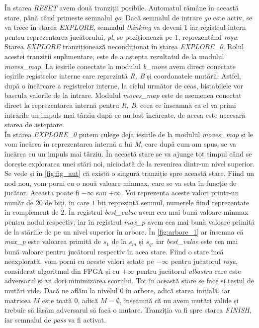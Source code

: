 \documentclass[12pt,twoside,a4paper,fleqn]{book}
\theoremstyle{definition}
\begin{document}
În starea \emph{RESET} avem două tranziții posibile. Automatul rămâne în această stare, până când primește semnalul \emph{go}. Dacă semnalul de intrare \emph{go} este activ, se va trece în starea \emph{EXPLORE}, semnalul \emph{thinking} va deveni $1$ iar registrul intern pentru reprezentarea jucătorului, \emph{pl}, se poziționează pe $1$, reprezentând \emph{roșu}.
Starea \emph{EXPLORE} tranziționează necondiționat în starea \emph{EXPLORE\_0}. Rolul acestei tranziții suplimentare, este de a aștepta rezultatul de la modulul \emph{moves\_map}. La ieșirile conectate la modulul \emph{b\_move} avem direct conectate ieșirile registrelor interne care reprezintă \emph{R, B} și coordonatele mutării. Astfel, după o încărcare a registrelor interne, la ciclul următor de ceas, bistabilele vor bascula valorile de la intrare. Modulul \emph{moves\_map} este de asemenea conectat direct la reprezentarea internă pentru \emph{R, B}, ceea ce înseamnă ca el va primi intrările un impuls mai târziu după ce au fost încărcate, de aceea este necesară starea de așteptare.\\
În starea \emph{EXPLORE\_0} putem culege deja ieșirile de la modulul \emph{moves\_map} și le vom încărca în reprezentarea internă a lui \emph{M}, care după cum am spus, se va încărca cu un impuls mai târziu. În această stare se va ajunge tot timpul când se dorește explorarea unei stări noi, niciodată de la revenirea dintr-un nivel superior. Se vede și în \ref{fig:fig_aut} că există o singură tranziție spre această stare. Fiind un nod nou, vom porni cu o nouă valoare minmax, care se va seta în funcție de jucător. Aceasta poate fi $-\infty$ sau $+\infty$. Voi reprezenta aceste valori printr-un număr de $20$ de biți, în care $1$ bit reprezintă semnul, numerele fiind reprezentate în complement de $2$. În registrul \emph{best\_value} avem cea mai bună valoare minmax pentru nodul respectiv, iar în registrul \emph{max\_p} avem cea mai bună valoare primită de la stăriile de pe un nivel superior în arbore. În \ref{fig:arbore_1} ar însemna că \emph{max\_p} este valoarea primită de $s_{1}$ de la $s_{m}$ și $s_{q}$, iar \emph{best\_value} este cea mai bună valoare pentru jucătorul respectiv în acea stare. Fiind o stare încă neexplorată, vom porni cu aceste valori setate pe $-\infty$ pentru jucatorul \emph{roșu}, considerat algoritmul din FPGA și cu $+\infty$ pentru jucătorul \emph{albastru} care este adversarul și va dori minimizarea scorului. Tot în această stare se face și testul de mutări vide. Dacă ne aflăm la nivelul $0$ în arbore, adică starea inițială, iar matricea $M$ este toată $0$, adică $M = \emptyset $, înseamnă că nu avem mutări valide și trebuie să lăsăm adversarul să facă o mutare. Tranziția va fi spre starea \emph{FINISH}, iar semnalul de \emph{pass} va fi activat.
\end{document}
